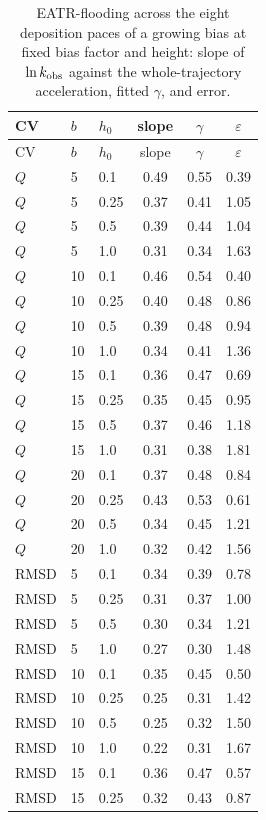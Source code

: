 \begin{longtable}{lllccc}
\caption{EATR-flooding across the eight deposition paces of a growing bias at fixed bias factor and height: slope of $\ln k_{\rm obs}$ against the whole-trajectory acceleration, fitted $\gamma$, and error.}\label{tab:s8full}\\
\toprule
CV & $b$ & $h_0$ & slope & $\gamma$ & $\varepsilon$\\ \midrule
\endfirsthead
\toprule
CV & $b$ & $h_0$ & slope & $\gamma$ & $\varepsilon$\\ \midrule
\endhead
\bottomrule
\endfoot
$Q$ & 5 & 0.1 & 0.49 & 0.55 & 0.39 \\
$Q$ & 5 & 0.25 & 0.37 & 0.41 & 1.05 \\
$Q$ & 5 & 0.5 & 0.39 & 0.44 & 1.04 \\
$Q$ & 5 & 1.0 & 0.31 & 0.34 & 1.63 \\
$Q$ & 10 & 0.1 & 0.46 & 0.54 & 0.40 \\
$Q$ & 10 & 0.25 & 0.40 & 0.48 & 0.86 \\
$Q$ & 10 & 0.5 & 0.39 & 0.48 & 0.94 \\
$Q$ & 10 & 1.0 & 0.34 & 0.41 & 1.36 \\
$Q$ & 15 & 0.1 & 0.36 & 0.47 & 0.69 \\
$Q$ & 15 & 0.25 & 0.35 & 0.45 & 0.95 \\
$Q$ & 15 & 0.5 & 0.37 & 0.46 & 1.18 \\
$Q$ & 15 & 1.0 & 0.31 & 0.38 & 1.81 \\
$Q$ & 20 & 0.1 & 0.37 & 0.48 & 0.84 \\
$Q$ & 20 & 0.25 & 0.43 & 0.53 & 0.61 \\
$Q$ & 20 & 0.5 & 0.34 & 0.45 & 1.21 \\
$Q$ & 20 & 1.0 & 0.32 & 0.42 & 1.56 \\
RMSD & 5 & 0.1 & 0.34 & 0.39 & 0.78 \\
RMSD & 5 & 0.25 & 0.31 & 0.37 & 1.00 \\
RMSD & 5 & 0.5 & 0.30 & 0.34 & 1.21 \\
RMSD & 5 & 1.0 & 0.27 & 0.30 & 1.48 \\
RMSD & 10 & 0.1 & 0.35 & 0.45 & 0.50 \\
RMSD & 10 & 0.25 & 0.25 & 0.31 & 1.42 \\
RMSD & 10 & 0.5 & 0.25 & 0.32 & 1.50 \\
RMSD & 10 & 1.0 & 0.22 & 0.31 & 1.67 \\
RMSD & 15 & 0.1 & 0.36 & 0.47 & 0.57 \\
RMSD & 15 & 0.25 & 0.32 & 0.43 & 0.87 \\

\end{longtable}
